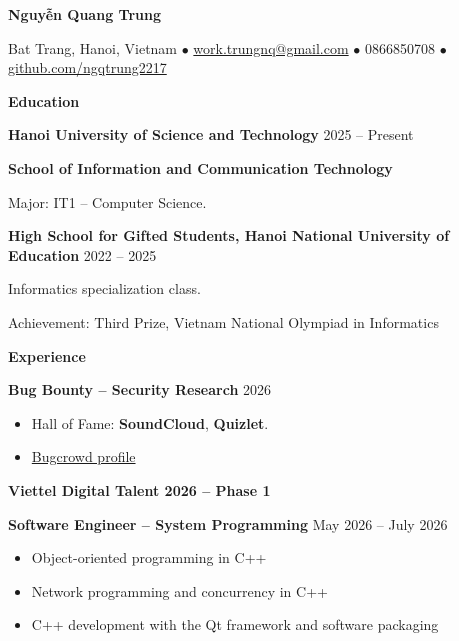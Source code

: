 \documentclass[11pt]{article}
\begin{document}
\begin{center}
    \textbf{Nguyễn Quang Trung}\\
    \hrulefill
\end{center}

\begin{center}
    Bat Trang, Hanoi, Vietnam $\bullet$ \href{mailto:work.trungnq@gmail.com}{work.trungnq@gmail.com} $\bullet$ 0866850708 $\bullet$ \href{https://github.com/ngqtrung2217}{github.com/ngqtrung2217}
\end{center}

\vspace{0.5pt}

\begin{center}
    \textbf{Education}
\end{center}

\textbf{Hanoi University of Science and Technology} \hfill 2025 -- Present

\textbf{School of Information and Communication Technology}

Major: IT1 -- Computer Science.

\vspace{12pt}

\textbf{High School for Gifted Students, Hanoi National University of Education} \hfill 2022 -- 2025

Informatics specialization class.

Achievement: Third Prize, Vietnam National Olympiad in Informatics

\vspace{12pt}

\begin{center}
    \textbf{Experience}
\end{center}

\vspace{12pt}

\textbf{Bug Bounty -- Security Research} \hfill 2026
\begin{itemize}[noitemsep, topsep=0pt, partopsep=0pt, parsep=0pt]
    \item Hall of Fame: \textbf{SoundCloud}, \textbf{Quizlet}.
    \item \href{https://bugcrowd.com/0xtrung}{Bugcrowd profile}
\end{itemize}
\vspace{12pt}

\textbf{Viettel Digital Talent 2026 -- Phase 1}

\textbf{Software Engineer -- System Programming} \hfill May 2026 -- July 2026
\begin{itemize}[noitemsep, topsep=0pt, partopsep=0pt, parsep=0pt]
    \item Object-oriented programming in C++
    \item Network programming and concurrency in C++
    \item C++ development with the Qt framework and software packaging
\end{itemize}
\end{document}
